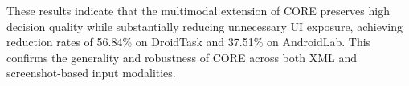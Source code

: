 \begin{table}[htbp]
  \centering
  \caption{Performance of CORE with multimodal (screenshot-based) input on DroidTask and AndroidLab datasets.}
  \label{tab:screenshot-results}
\end{table}

These results indicate that the multimodal extension of CORE preserves high decision quality while substantially reducing unnecessary UI exposure, achieving reduction rates of 56.84\% on DroidTask and 37.51\% on AndroidLab. This confirms the generality and robustness of CORE across both XML and screenshot-based input modalities.